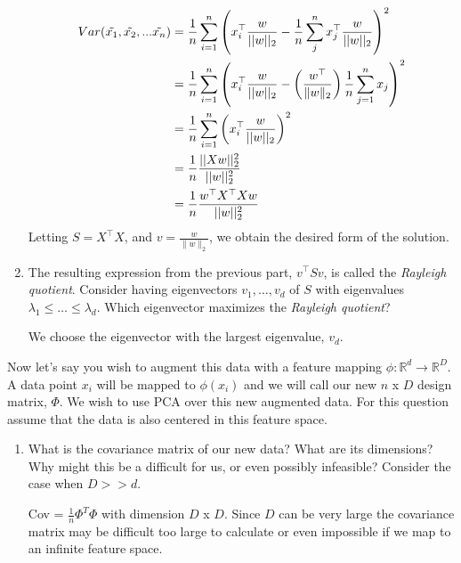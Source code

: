 \begin{Parts}
\begin{enumerate}
    \begin{solution}
    \begin{align*}
        Var(\Tilde{x_1}, \Tilde{x_2}, ... \Tilde{x_n}) &= \frac{1}{n} \sum_{i = 1}^{n} \left(x_{i}^{\top} \frac{w}{||w||_2} - \frac{1}{n} \sum_{j}^{n} x_{j}^{\top} \frac{w}{||w||_2}\right)^2 \\
	&= \frac{1}{n} \sum_{i = 1}^{n} \left(x_{i}^{\top} \frac{w}{||w||_2} - \left(\frac{w^{\top}}{\|w\|_2}\right) \frac{1}{n} \sum_{j = 1}^{n} x_{j}\right)^2 \\
	&= \frac{1}{n} \sum_{i = 1}^{n} \left(x_{i}^{\top}\frac{w}{||w||_2}\right)^2 \\
	&= \frac{1}{n} \frac{||Xw||_2^2}{||w||_2^2} \\
	&= \frac{1}{n} \frac{w^{\top}X^{\top}Xw}{||w||_2^2}
    \end{align*}
    Letting $S = X^{\top}X$, and $v = \frac{w}{\|w\|_2}$, we obtain the desired form of the solution.
\end{solution}
    
    \item The resulting expression from the previous part, $v^{\top} S v$, is called the \textit{Rayleigh quotient}. Consider having eigenvectors $v_1, \dots, v_d$ of $S$ with eigenvalues $\lambda_1 \leq \dots \leq \lambda_d$. Which eigenvector maximizes the \textit{Rayleigh quotient}? %
    
    \begin{solution}
        We choose the eigenvector with the largest eigenvalue, $v_d$.
\end{solution}
    
\end{enumerate}
\Part Now let's say you wish to augment this data with a feature mapping $\phi:\mathbb{R}^d\xrightarrow{}\mathbb{R}^D$. A data point $x_i$ will be mapped to $\phi(x_i)$ and we will call our new $n$ x $D$ design matrix, $\Phi$. We wish to use PCA over this new augmented data. For this question assume that the data is also centered in this feature space.

\begin{enumerate}
    \item What is the covariance matrix of our new data? What are its dimensions? Why might this be a difficult for us, or even possibly infeasible? Consider the case when $D >> d$.
    
\begin{solution}
        Cov = $\frac{1}{n}\Phi^T\Phi$ with dimension $D$ x $D$. Since $D$ can be very large the covariance matrix may be difficult too large to calculate or even impossible if we map to an infinite feature space.
\end{solution}
\end{enumerate}


\end{Parts}
